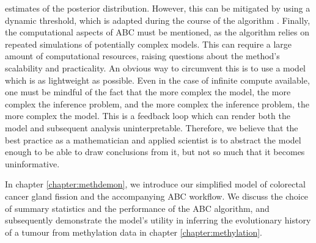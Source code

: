 estimates of the posterior distribution. However, this can be mitigated by using a dynamic threshold, which is
adapted during the course of the algorithm \cite{prangle_adapting_2017}.
Finally, the computational aspects of ABC must be mentioned, as the algorithm relies on repeated simulations of
potentially complex models. This can require a large amount of computational resources, raising questions about
the method's scalability and practicality. An obvious way to circumvent this is to use a model which is as
lightweight as possible. Even in the case of infinite compute available, one must be mindful of the fact that
the more complex the model, the more complex the inference problem, and the more complex the inference problem,
the more complex the model. This is a feedback loop which can render both the model and subsequent analysis
uninterpretable. Therefore, we believe that the best practice as a mathematician and applied scientist is to abstract
the model enough to be able to draw conclusions from it, but not so much that it becomes uninformative. \par
In chapter \ref{chapter:methdemon}, we introduce our simplified model of colorectal cancer gland fission and
the accompanying ABC workflow. We discuss the choice of summary statistics and the performance of the ABC
algorithm, and subsequently demonstrate the model's utility in inferring the evolutionary history of a tumour
from methylation data in chapter \ref{chapter:methylation}.


